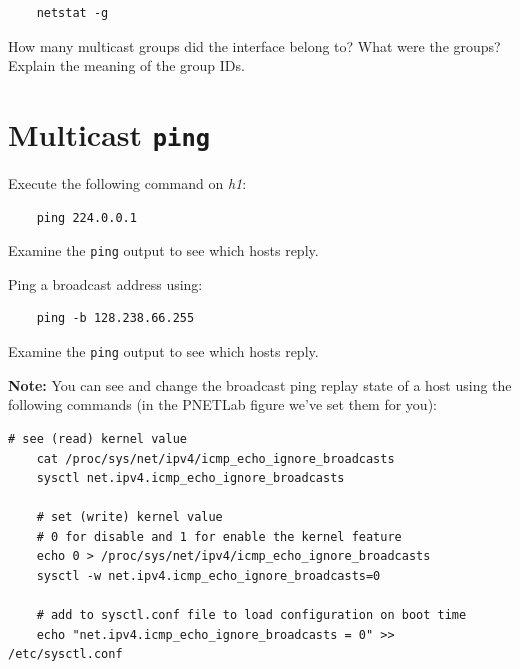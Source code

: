 \documentclass{UTNetLab}
\begin{document}
    \begin{lstlisting}
	netstat -g
    \end{lstlisting}
    
    \begin{report}
        \item How many multicast groups did the interface belong to? What were the groups? Explain the meaning of the group IDs.
    \end{report}

\section{Multicast \texttt{ping}}

    Execute the following command on \textit{h1}:

    \begin{lstlisting}
	ping 224.0.0.1
    \end{lstlisting}
Examine the \lstinline{ping} output to see which hosts reply.

Ping a broadcast address using:

    \begin{lstlisting}
	ping -b 128.238.66.255
    \end{lstlisting}
    Examine the \lstinline{ping} output to see which hosts reply.

\textbf{Note: }You can see and change the broadcast ping replay state of a host using the following commands (in the PNETLab figure we've set them for you):
\begin{lstlisting}[emph=eth0]
    # see (read) kernel value
    cat /proc/sys/net/ipv4/icmp_echo_ignore_broadcasts
    sysctl net.ipv4.icmp_echo_ignore_broadcasts
    
    # set (write) kernel value
    # 0 for disable and 1 for enable the kernel feature
    echo 0 > /proc/sys/net/ipv4/icmp_echo_ignore_broadcasts
    sysctl -w net.ipv4.icmp_echo_ignore_broadcasts=0
    
    # add to sysctl.conf file to load configuration on boot time
    echo "net.ipv4.icmp_echo_ignore_broadcasts = 0" >> /etc/sysctl.conf
\end{lstlisting}
    
\end{document}
